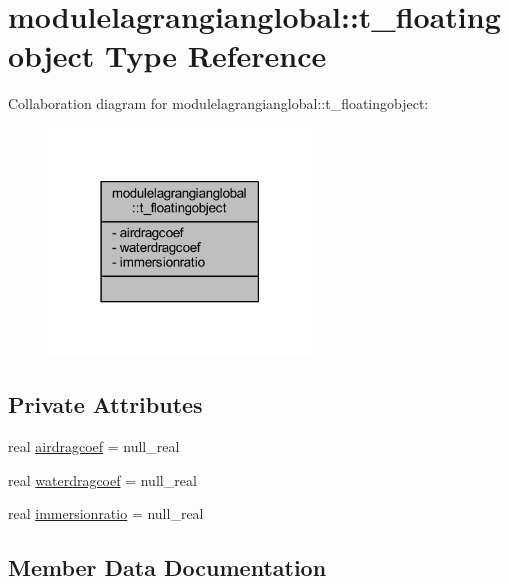 \hypertarget{structmodulelagrangianglobal_1_1t__floatingobject}{}\section{modulelagrangianglobal\+:\+:t\+\_\+floatingobject Type Reference}
\label{structmodulelagrangianglobal_1_1t__floatingobject}


Collaboration diagram for modulelagrangianglobal\+:\+:t\+\_\+floatingobject\+:\nopagebreak
\begin{figure}[H]
\begin{center}
\leavevmode
\includegraphics[width=198pt]{structmodulelagrangianglobal_1_1t__floatingobject__coll__graph}
\end{center}
\end{figure}
\subsection*{Private Attributes}
\begin{DoxyCompactItemize}
\item 
real \mbox{\hyperlink{structmodulelagrangianglobal_1_1t__floatingobject_a68d7d14c1c74fd73060587bf2877322d}{airdragcoef}} = null\+\_\+real
\item 
real \mbox{\hyperlink{structmodulelagrangianglobal_1_1t__floatingobject_a4269b3b7749b5464b19a6cca318cbbf7}{waterdragcoef}} = null\+\_\+real
\item 
real \mbox{\hyperlink{structmodulelagrangianglobal_1_1t__floatingobject_aea8905fe19f549b1e410e0c80ffe2e1a}{immersionratio}} = null\+\_\+real
\end{DoxyCompactItemize}


\subsection{Member Data Documentation}
\mbox{\label{structmodulelagrangianglobal_1_1t__floatingobject_a68d7d14c1c74fd73060587bf2877322d}} 
